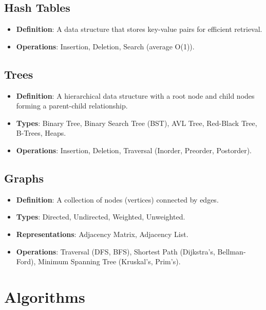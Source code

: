 \documentclass{article}
\begin{document}
\subsection{Hash Tables}
\begin{itemize}
    \item \textbf{Definition}: A data structure that stores key-value pairs for efficient retrieval.
    \item \textbf{Operations}: Insertion, Deletion, Search (average O(1)).
\end{itemize}

\subsection{Trees}
\begin{itemize}
    \item \textbf{Definition}: A hierarchical data structure with a root node and child nodes forming a parent-child relationship.
    \item \textbf{Types}: Binary Tree, Binary Search Tree (BST), AVL Tree, Red-Black Tree, B-Trees, Heaps.
    \item \textbf{Operations}: Insertion, Deletion, Traversal (Inorder, Preorder, Postorder).
\end{itemize}

\subsection{Graphs}
\begin{itemize}
    \item \textbf{Definition}: A collection of nodes (vertices) connected by edges.
    \item \textbf{Types}: Directed, Undirected, Weighted, Unweighted.
    \item \textbf{Representations}: Adjacency Matrix, Adjacency List.
    \item \textbf{Operations}: Traversal (DFS, BFS), Shortest Path (Dijkstra’s, Bellman-Ford), Minimum Spanning Tree (Kruskal’s, Prim’s).
\end{itemize}

\section{Algorithms}
\end{document}

